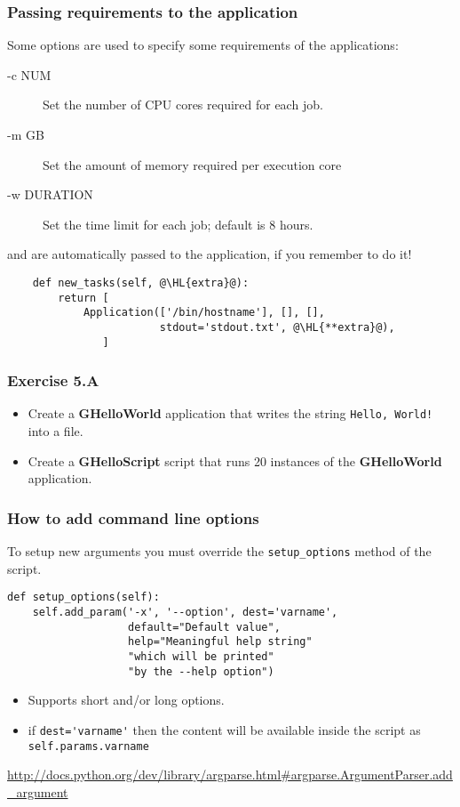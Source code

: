 \documentclass[english,serif,mathserif,xcolor=pdftex,dvipsnames,table]{beamer}
\begin{document}
\begin{frame}[fragile]
  \frametitle{Passing requirements to the application}
  Some options are used to specify some requirements of the applications:
  \begin{description}
  \item[-c NUM] Set the number of CPU cores required for each job.
  \item[-m GB] Set the amount of memory required per execution core
  \item[-w DURATION] Set the time limit for each job; default is 8
    hours.
  \end{description}

  \pause
  and are automatically passed to the application, if you remember to
  do it!
  \begin{lstlisting}
    def new_tasks(self, @\HL{extra}@):
        return [
            Application(['/bin/hostname'], [], [],
                        stdout='stdout.txt', @\HL{**extra}@),
               ]
  \end{lstlisting}
\end{frame}

\begin{frame}[fragile]
  \frametitle{Exercise 5.A}
  \begin{itemize}
  \item Create a \textbf{GHelloWorld} application that writes the
    string \texttt{Hello, World!} into a file.
  \item Create a \textbf{GHelloScript} script that runs 20 instances of
    the \textbf{GHelloWorld} application.
  \end{itemize}
\end{frame}

\begin{frame}[fragile]
  \frametitle{How to add command line options}
  To setup new arguments you must override the \lstinline|setup_options|
  method of the script.

  \begin{lstlisting}[showstringspaces=false]
def setup_options(self):
    self.add_param('-x', '--option', dest='varname',
                   default="Default value",
                   help="Meaningful help string"
                   "which will be printed"
                   "by the --help option")    
  \end{lstlisting}

  \begin{itemize}
  \item Supports short and/or long options.
  \item if \lstinline|dest='varname'| then the content will be
    available inside the script as \lstinline|self.params.varname|
  \end{itemize}

  \begin{references}
    \url{http://docs.python.org/dev/library/argparse.html#argparse.ArgumentParser.add_argument}
  \end{references}
\end{frame}
\end{document}
